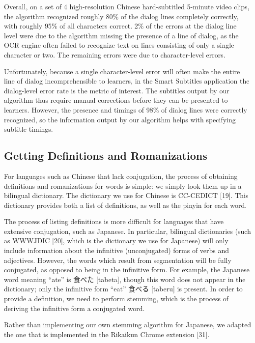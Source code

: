 \documentclass{sigchi}
\begin{document}
Overall, on a set of 4 high-resolution Chinese hard-subtitled 5-minute video clips, the algorithm recognized roughly 80\% of the dialog lines completely correctly, with roughly 95\% of all characters correct. 2\% of the errors at the dialog line level were due to the algorithm missing the presence of a line of dialog, as the OCR engine often failed to recognize text on lines consisting of only a single character or two. The remaining errors were due to character-level errors.

Unfortunately, because a single character-level error will often make the entire line of dialog incomprehensible to learners, in the Smart Subtitles application the dialog-level error rate is the metric of interest. The subtitles output by our algorithm thus require manual corrections before they can be presented to learners. However, the presence and timings of 98\% of dialog lines were correctly recognized, so the information output by our algorithm helps with specifying subtitle timings.

\subsection{Getting Definitions and Romanizations}

For languages such as Chinese that lack conjugation, the process of obtaining definitions and romanizations for words is simple: we simply look them up in a bilingual dictionary. The dictionary we use for Chinese is CC-CEDICT [19]. This dictionary provides both a list of definitions, as well as the pinyin for each word.

The process of listing definitions is more difficult for languages that have extensive conjugation, such as Japanese. In particular, bilingual dictionaries (such as WWWJDIC [20], which is the dictionary we use for Japanese) will only include information about the infinitive (unconjugated) forms of verbs and adjectives. However, the words which result from segmentation will be fully conjugated, as opposed to being in the infinitive form. For example, the Japanese word meaning “ate” is 食べた [tabeta], though this word does not appear in the dictionary; only the infinitive form “eat” 食べる [taberu] is present. In order to provide a definition, we need to perform stemming, which is the process of deriving the infinitive form a conjugated word.

Rather than implementing our own stemming algorithm for Japanese, we adapted the one that is implemented in the Rikaikun Chrome extension [31].
\end{document}
